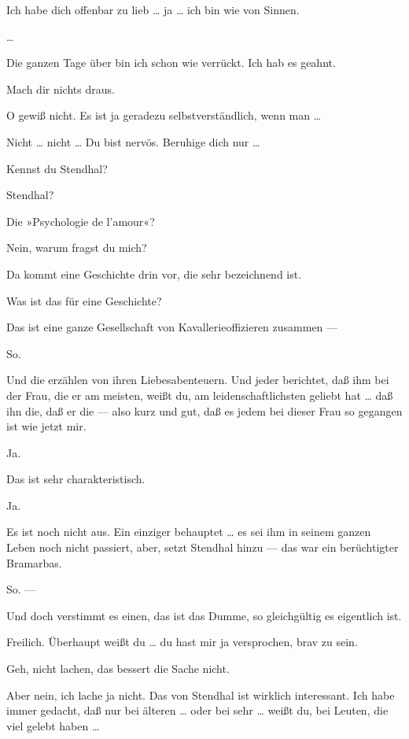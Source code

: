 \documentclass[
	final,
	a4paper,
	ngerman,
	mpinclude = true, %
	twoside = true,
	open = right,
	cleardoublepage = plain,
	DIV = 13,
	BCOR = 1cm,
	titlepage = firstiscover,
	]{scrbook}
\newcommand{\thecharacter}[1]{\textup{\textsc{#1}}\xspace}
\newcommand{\theherr}{\thecharacter{Junger Herr}}
\newcommand{\thefrau}{\thecharacter{Junge Frau}}
\newcommand{\character}[1]{\item[#1:]}
\newcommand{\herr}{\character{\theherr}}
\newcommand{\frau}{\character{\thefrau}}
\begin{document}
\begin{play}
	\herr
	Ich habe dich offenbar zu lieb \ldots{} ja \ldots{} ich bin wie von Sinnen.

	\frau
	\ldots{}

	\herr
	Die ganzen Tage über bin ich schon wie verrückt. Ich hab es geahnt.

	\frau
	Mach dir nichts draus.

	\herr
	O gewiß nicht. Es ist ja geradezu selbstverständlich, wenn man \ldots{}

	\frau
	Nicht \ldots{} nicht \ldots{} Du bist nervös. Beruhige dich nur \ldots{}

	\herr
	Kennst du Stendhal?

	\frau
	Stendhal?

	\herr
	Die »Psychologie de l'amour«?

	\frau
	Nein, warum fragst du mich?

	\herr
	Da kommt eine Geschichte drin vor, die sehr bezeichnend ist.

	\frau
	Was ist das für eine Geschichte?

	\herr
	Das ist eine ganze Gesellschaft von Kavallerieoffizieren zusammen ---

	\frau
	So.

	\herr
	Und die erzählen von ihren Liebesabenteuern. Und jeder berichtet, daß ihm bei der Frau, die er am meisten, weißt du, am leidenschaftlichsten geliebt hat \ldots{} daß ihn die, daß er die --- also kurz und gut, daß es jedem bei dieser Frau so gegangen ist wie jetzt mir.

	\frau
	Ja.

	\herr
	Das ist sehr charakteristisch.

	\frau
	Ja.

	\herr
	Es ist noch nicht aus. Ein einziger behauptet \ldots{} es sei ihm in seinem ganzen Leben noch nicht passiert, aber, setzt Stendhal hinzu --- das war ein berüchtigter Bramarbas.

	\frau
	So. ---

	\herr
	Und doch verstimmt es einen, das ist das Dumme, so gleichgültig es eigentlich ist.

	\frau
	Freilich. Überhaupt weißt du \ldots{} du hast mir ja versprochen, brav zu sein.

	\herr
	Geh, nicht lachen, das bessert die Sache nicht.

	\frau
	Aber nein, ich lache ja nicht. Das von Stendhal ist wirklich interessant. Ich habe immer gedacht, daß nur bei älteren \ldots{} oder bei sehr \ldots{} weißt du, bei Leuten, die viel gelebt haben \ldots{}


\end{play}
\end{document}
